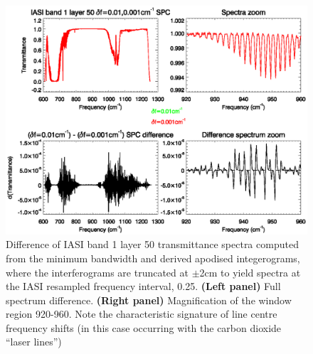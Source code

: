 \begin{figure}[htp]
  \centering
  \includegraphics[bb=70 230 540 390,clip,scale=0.8]{graphics/band1_lyr50_dspc_comparison_z-920-960_iasidf_mindeltaf.eps}
  \caption{Difference of IASI band 1 layer 50 transmittance spectra computed from the minimum bandwidth  and  derived apodised integerograms, where the interferograms are truncated at $\pm$2cm to yield spectra at the IASI resampled frequency interval, 0.25\invcm. \textbf{(Left panel)} Full spectrum difference. \textbf{(Right panel)} Magnification of the window region 920-960\invcm. Note the characteristic signature of line centre frequency shifts (in this case occurring with the carbon dioxide ``laser lines'')}
  \label{fig:band1_lyr50_dspc_comparison_z-920-960_iasidf_mindeltaf}
\end{figure}
 
